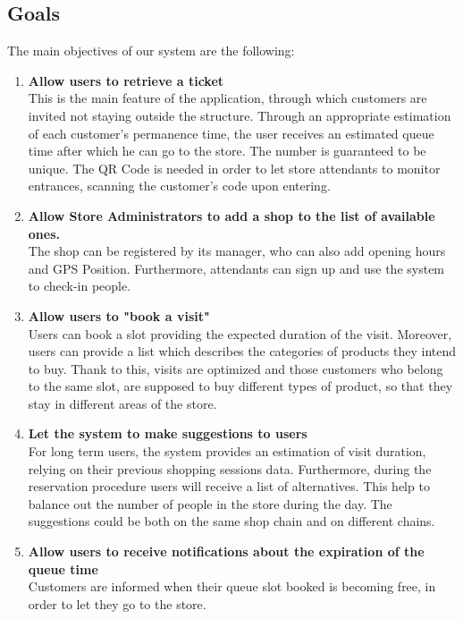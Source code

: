 \documentclass[table, 12pt]{article}
\begin{document}
\begin{flushleft}
    \subsection{Goals}
    \label{goals}
    The main objectives of our system are the following:
    \begin{enumerate}[label=$\bullet$ \textbf{G\arabic*:}]
        \item \textbf{Allow users to retrieve a ticket}\\This is the main feature of the application, through which customers are invited not staying outside the structure. Through an appropriate estimation of each customer's permanence time, the user receives an estimated queue time after which he can go to the store. The number is guaranteed to be unique. The QR Code is needed in order to let store attendants to monitor entrances, scanning the customer's code upon entering.
        \item \textbf{Allow Store Administrators to add a shop to the list of available ones.}\\The shop can be registered by its manager, who can also add opening hours and GPS Position. Furthermore, attendants can sign up and use the system to check-in people.
        \item \textbf{Allow users to "book a visit"}\\Users can book a slot providing the expected duration of the visit. Moreover, users can provide a list which describes the categories of products they intend to buy. Thank to this, visits are optimized and those customers who belong to the same slot, are supposed to buy different types of product, so that they stay in different areas of the store.
        \item \textbf{Let the system to make suggestions to users}\\For long term users, the system provides an estimation of visit duration, relying on their previous shopping sessions data. Furthermore, during the reservation procedure users will receive a list of alternatives. This help to balance out the number of people in the store during the day. The suggestions could be both on the same shop chain and on different chains.
        \item \textbf{Allow users to receive notifications about the expiration of the queue time}\\Customers are informed when their queue slot booked is becoming free, in order to let they go to the store.
    \end{enumerate}

\end{flushleft}
\end{document}
